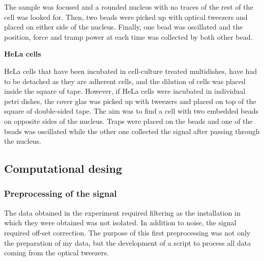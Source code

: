 \documentclass[12pt, a4paper]{article} %
\begin{document}
The sample was focused and a rounded nucleus with no traces of the rest of the cell was looked for. Then, two beads were picked up with optical tweezers and placed on either side of the nucleus. Finally, one bead was oscillated and the position, force and tramp power at each time was collected by both other bead.

\setlength{\parindent}{0pt}

\newpage

{\textbf{HeLa cells}}

HeLa cells that have been incubated in cell-culture treated multidishes, have had to be detached as they are adherent cells, and the dilution of cells was placed inside the square of tape. However, if HeLa cells were incubated in individual petri dishes, the cover glas was picked up with tweezers and placed on top of the square of double-sided tape. The aim was to find a cell with two embedded beads on opposite sides of the nucleus. Traps were placed on the beads and one of the beads was oscillated while the other one collected the signal after passing through the nucleus.

\setlength{\parindent}{8pt}

\setlength{\parskip}{0mm}

\subsection{Computational desing}

\subsubsection{Preprocessing of the signal}

The data obtained in the experiment required filtering as the installation in which they were obtained was not isolated. In addition to noise, the signal required off-set correction. The purpose of this first preprocessing was not only the preparation of my data, but the development of a script to process all data coming from the optical tweezers. 
\end{document}
